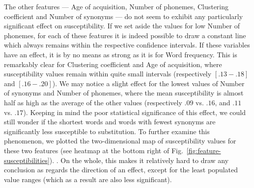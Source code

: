 The other features --- Age of acquisition, Number of phonemes, Clustering coefficient and Number of synonyms --- do not seem to exhibit any particularly significant effect on susceptibility.
{If we set aside the values for low Number of phonemes}, for each of these features it is indeed possible to draw a constant line which always remains within the respective confidence intervals.
If these variables have an effect, it is by no means as strong as it is for Word frequency.
This is remarkably clear for Clustering coefficient and Age of acquisition, where susceptibility values remain within quite small intervals (respectively $[.13-.18]$ and $[.16-.20]$).
{We may notice a slight effect for the lowest values of Number of synonyms and Number of phonemes, where the mean susceptibility is almost half as high as the average of the other values (respectively $.09$ vs. $.16$, and $.11$ vs. $.17$).}
Keeping in mind the poor statistical significance of this effect, we could still wonder if the shortest words and words with fewest synonyms are significantly less susceptible to substitution.
To further examine this phenomenon, we plotted the two-dimensional map of susceptibility values for these two features (see heatmap at the bottom right of Fig.~\ref{fig:feature-susceptibilities}).
. {On the whole, this makes it relatively hard to draw any conclusion as regards the direction of an effect, except for the least populated value ranges (which as a result are also less significant).}


